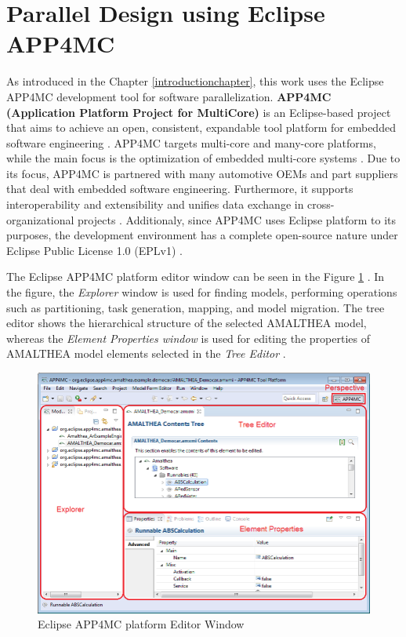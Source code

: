 \section{Parallel Design using Eclipse APP4MC} \label{app4mcchapter}
As introduced in the Chapter \ref{introductionchapter}, this work uses the Eclipse APP4MC development tool for software parallelization. \textbf{APP4MC (Application Platform Project for MultiCore)} \cite{ICPDSSE} \cite{app4mcweb} is an Eclipse-based project that aims to achieve an open, consistent, expandable tool platform for embedded software engineering \cite{app4mchelp}. APP4MC targets multi-core and many-core platforms, while the main focus is the optimization of embedded multi-core systems \cite{app4mchelp}. Due to its focus, APP4MC is partnered with many automotive OEMs and part suppliers that deal with embedded software engineering.  Furthermore, it supports interoperability and extensibility and unifies data exchange in cross-organizational projects \cite{app4mcweb}. Additionaly, since APP4MC uses Eclipse platform to its purposes, the development environment has a complete open-source nature under Eclipse Public License 1.0 (EPLv1) \cite{epl}. 

The Eclipse APP4MC platform editor window can be seen in the Figure \ref{fig:app4mcenv} \cite{app4mchelp}. In the figure, the \textit{Explorer} window is used for finding models, performing operations such as partitioning, task generation, mapping, and model migration. The tree editor shows the hierarchical structure of the selected AMALTHEA model, whereas the \textit{Element Properties window} is used for editing the properties of AMALTHEA model elements selected in the \textit{Tree Editor} \cite{app4mchelp}.

\begin{figure}[!ht]
	\centering
	\captionsetup{justification=centering}
	\includegraphics[width=\textwidth]{content/images/app4mcenv.png}
	\caption{Eclipse APP4MC platform Editor Window \cite{app4mchelp}}
	\label{fig:app4mcenv}
\end{figure}

